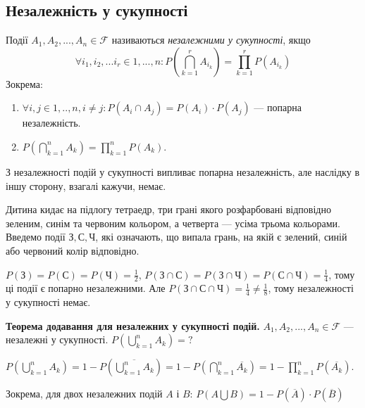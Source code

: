 \subsection{Незалежність у сукупності}
\begin{definition}
    Події $A_1, A_2, ..., A_n \in \mathcal{F}$ називаються \emph{незалежними у сукупності}, якщо
    \begin{equation}\label{eq:indep}
        \forall i_1, i_2, ... i_r \in {1,...,n}: P\left(\bigcap_{k=1}^r A_{i_k}\right) = \prod_{k=1}^r P\left(A_{i_k}\right)
    \end{equation}
    Зокрема:
    \nopagebreak
    \begin{enumerate}
        \item $\forall i, j \in {1,..,n}, i\neq j: P(A_i \cap A_j) = P(A_i)\cdot P(A_j)$ --- попарна незалежність.
        \item $P(\bigcap_{k=1}^n A_k) = \prod_{k=1}^n P(A_k)$.
    \end{enumerate}
\end{definition}
\begin{remark}
    З незалежності подій у сукупності випливає попарна незалежність, 
    але наслідку в іншу сторону, взагалі кажучи, немає.
\end{remark}
\begin{example}
    Дитина кидає на підлогу тетраедр, три грані якого розфарбовані відповідно зеленим, синім та червоним кольором,
    а четверта --- усіма трьома кольорами. Введемо події $\text{З}, \text{С}, \text{Ч}$, які означають, що випала грань,
    на якій є зелений, синій або червоний колір відповідно.

    $P(\text{З}) = P(\text{С}) = P(\text{Ч}) = \frac{1}{2}$, 
    $P(\text{З} \cap \text{С}) = P(\text{З} \cap \text{Ч}) = P(\text{С} \cap \text{Ч}) = \frac{1}{4}$,
    тому ці події є попарно незалежними. Але $P(\text{З} \cap \text{С} \cap \text{Ч}) = \frac{1}{4} \neq \frac{1}{8}$,
    тому незалежності у сукупності немає.
\end{example}

\noindent \textbf{Теорема додавання для незалежних у сукупності подій.}
$A_1, A_2, ..., A_n \in \mathcal{F}$ --- незалежні у сукупності.
$P(\bigcup_{k=1}^n A_k) = \text{?}$

$P(\bigcup_{k=1}^n A_k) = 1 - P(\overline{\bigcup_{k=1}^n A_k}) = 1 - P(\bigcap_{k=1}^n \overline{A_k}) = 1 - \prod_{k=1}^n P(\overline{A_k})$.

\noindent Зокрема, для двох незалежних подій $A$ і $B$: $P(A\bigcup B) = 1 - P(\overline{A}) \cdot P(\overline{B})$

